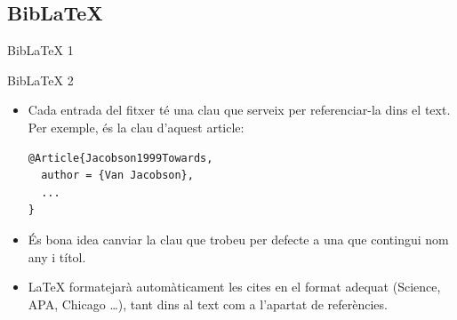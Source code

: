 \subsection{Bib\LaTeX{}}
\begin{frame}[fragile]{Bib\LaTeX{} 1}
\end{frame}

\begin{frame}[fragile]{Bib\LaTeX{} 2}
\begin{itemize}
\item Cada entrada del fitxer  té una clau que serveix per referenciar-la dins el text.
Per exemple,  és la clau d'aquest article:
\begin{verbatim}
@Article{Jacobson1999Towards,
  author = {Van Jacobson},
  ...
}
\end{verbatim}
\item És bona idea canviar la clau que trobeu per defecte a una que contingui nom any i títol.
\item \LaTeX{} formatejarà automàticament les cites en el format adequat (Science, APA, Chicago \dots), tant dins al text com a l'apartat de referències.
\end{itemize}
\end{frame}

